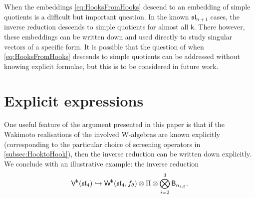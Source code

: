 \documentclass[10pt,a4paper]{amsart}
\numberwithin{equation}{section}
\newcommand{\kk}{\mathsf{k}}   %
\DeclarePairedDelimiter{\brac}{\lparen}{\rparen}   %
\newcommand{\alg}[1]{\mathfrak{#1}}  %
\newcommand{\VOA}[1]{\mathsf{#1}}    %
\newcommand{\SLA}[2]{\alg{#1}_{#2}}                      %
\newcommand{\slfour}{\SLA{sl}{4}}
\newcommand{\slnpone}{\SLA{sl}{n+1}}
\newcommand{\sroot}[1]{\alpha_{#1}}                                  %
\newcommand{\fmin}{f_\theta}                                        %
\newcommand{\Wsymb}{\VOA{W}}
\newcommand{\uaffvoa}[2]{\VOA{V}^{#1}\brac{#2}}                   %
\newcommand{\bgvoa}{\VOA{B}}                                      %
\newcommand{\uQHR}[3]{\Wsymb^{#1}\brac{#2,#3}}                    %
\theoremstyle{plain}
\begin{document}
When the embeddings \eqref{eq:HooksFromHooks} descend to an embedding of simple quotients is a difficult but important question. In the known $\slnpone$ cases, the inverse reduction descends to simple quotients for almost all $\kk$. There however, these embeddings can be written down and used directly to study singular vectors of a specific form. It is possible that the question of when \eqref{eq:HooksFromHooks} descends to simple quotients can be addressed without knowing explicit formulae, but this is to be considered in future work.

\appendix
\section{Explicit expressions} \label{app:ExpExp}

One useful feature of the argument presented in this paper is that if the Wakimoto realisations of the involved W-algebras are known explicitly (corresponding to the particular choice of screening operators in \cref{subsec:HooktoHook}), then the inverse reduction can be written down explicitly. We conclude with an illustrative example: the inverse reduction
%
\begin{equation}
    \uaffvoa{\kk}{\slfour} \hookrightarrow \uQHR{\kk}{\slfour}{\fmin}\otimes \Pi \otimes \bigotimes_{i=2}^{3} \bgvoa_{\sroot{i,3}} .
\end{equation}
%
\end{document}
